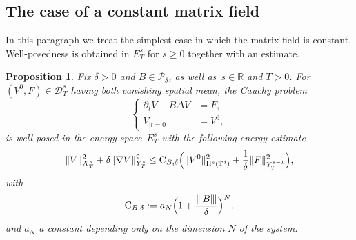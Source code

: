 \documentclass[10pt]{amsart}
\newtheorem{prop}{Proposition}[section]
\theoremstyle{definition}
\newcommand\R{\mathbb{R}}
\newcommand\T{\mathbb{T}}
\newcommand\C{\mathrm{C}}
\renewcommand\H{\mathrm{H}}
\newcommand{\vertiii}[1]{{\vert\kern-0.08em\vert\kern-0.08em\vert #1 \vert\kern-0.08em\vert\kern-0.08em\vert}}
\begin{document}
\subsection{The case of a constant matrix field}
In this paragraph we treat the simplest case in which the matrix field is constant. Well-posedness is obtained in $E_T^s$ for $s\geq 0$ together with an estimate.
\begin{prop}\label{prop:systlin}
Fix $\delta>0$ and $B\in\mathscr{P}_\delta$, as well as~$s\in \R$ and $T>0$. For $(V^0,F)\in \mathcal D_T^s$ having both vanishing spatial mean, the Cauchy problem
\[
\left\{
\begin{aligned}
\partial_t V-B \Delta V &= F,\\
V_{|t=0} &= V^0,
\end{aligned}
\right.
\]
is well-posed in the energy space~$E_{T}^s$ with the following energy estimate
\begin{align}
\label{eq:boundlinHs}
\|V\|_{X_{T}^s}^2 + \delta \|\nabla V\|_{Y_{T}^s}^2 \leq \textnormal{C}_{B,\delta} \Bigl(\| V^0\|_{\H^s(\T^d)}^2 + \frac{1}{\delta} \|F\|_{Y_{T}^{s-1}}^2\Bigr),
\end{align}
with
\begin{equation}
\label{eq:CAdelta} \C_{B,\delta}:= a_N \Bigl(1+\frac {\vertiii{B }} \delta\Bigr)^N,
\end{equation}
and $a_N$ a constant depending only on the dimension $N$ of the system.
\end{prop}
\end{document}
